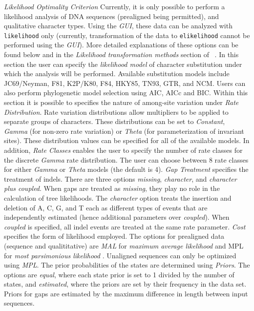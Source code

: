 	\hangindent=1cm  \emph{Likelihood Optimality Criterion} Currently, it is only possible to perform 
	 	a likelihood analysis of DNA sequences (prealigned being permitted), %
		and qualitative 	character types. Using the \emph{GUI}, these data can be analyzed with 
		\texttt{likelihood} only (currently, transformation of the data to \texttt{elikelihood} cannot be performed 
		using the \emph{GUI}). More detailed explanations of these options can be found below and in the 
		\emph{Likelihood transformation methods} section of  ~.
		 In this section the user can specify the \emph{likelihood model} of character 
		substitution under which the analysis will be performed.  Available substitution models include JC69/Neyman, 
		F81, K2P/K80, F84, HKY85, TN93, GTR, and NCM.  Users can also perform phylogenetic model 
		selection using AIC, AICc and BIC.  Within this section it is possible to specifies 
		the nature of among-site variation under \emph{Rate Distribution}.  Rate variation distributions allow 
		multipliers to be applied to separate groups of characters. 
		   These distributions can be set to \emph{Constant}, \emph{Gamma} (for non-zero 
		   rate variation) or  \emph{Theta} (for parameterization of invariant sites).  These distribution
		   values can be specified for all of the available models. In addition, \emph{Rate Classes} enables the user to 
		   specify the number of rate classes for the discrete \emph{Gamma} rate distribution. 
		   The user can choose between 8 rate classes for either \emph{Gamma} or \emph{Theta}
		   models (the default is 4).  \emph{Gap Treatment}  specifies the treatment of indels.  There are 
		   three options \emph{missing},  \emph{character}, and \emph{character plus coupled}.  When gaps are treated 
		   as \emph{missing}, they play no role in the calculation of tree likelihoods.  The \emph{character} 
		   option treats the insertion and deletion of A, C, G, and T each as different types of events that are 
		   independently estimated (hence additional parameters over \emph{coupled}). When \emph{coupled} 
		   is specified, all indel events are treated at the same rate parameter. 
		  \emph{Cost} specifies the form of likelihood employed.  The options for prealigned data 
		   (sequence and qualititative) are \emph{MAL} for \emph{maximum average likelihood} and {MPL} for 
		   \emph{most parsimonious likelihood} \cite{barryandhartigan1987}. Unaligned sequences can only be 
		   optimized using \emph{MPL}.  The prior probabilities of the states are determined using \emph{Priors}.   
		   The options are \emph{equal}, where each state prior is set to 1 divided by the number of states, and 
		   \emph{estimated}, where the priors are set by their frequency in the data set.  Priors for gaps are estimated 
		   by the maximum difference in length between input sequences.

